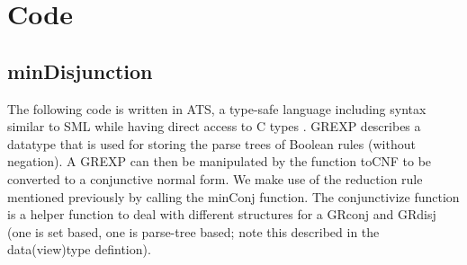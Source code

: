 \documentclass[phd,tocprelim]{cornell}
\theoremstyle{break}
\theoremstyle{empty}
\begin{document}
\section{Code}
\subsection{minDisjunction}

The following code is written in ATS, a type-safe language including syntax similar to SML while
having direct access to C types \cite{ATStypes03}.
GREXP describes a datatype that is used for storing the parse trees of Boolean rules (without negation).
A GREXP can then be manipulated by the function toCNF to be converted to a conjunctive normal form.
We make use of the reduction rule mentioned previously by calling the minConj function. The 
conjunctivize function is a helper function to deal with different structures for a GRconj
and GRdisj (one is set based, one is parse-tree based; note this described in the data(view)type defintion).
\end{document}
